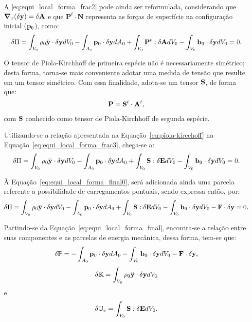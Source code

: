 A \autoref{eq:equi_local_forma_frac2} pode ainda ser reformulada, considerando que $\boldsymbol{\nabla}_x (\delta\mathbf{y}) = \delta \mathbf{A}$ e que $\mathbf{P}^t \cdot \mathbf{N}$ representa as forças de superfície na configuração inicial ($\mathbf{p}_{0}$), como:
\begin{align}
	\delta\Pi = \int_{V_{0}} \rho_{0} \ddot{\mathbf{y}} \cdot \delta\mathbf{y} dV_{0} - \int_{A_{0}} \mathbf{p}_{0} \cdot \delta\mathbf{y} dA_{0} + \int_{V_{0}} \mathbf{P}^{t} : \delta\mathbf{A} dV_{0} - \int_{V_{0}}  \mathbf{b}_0 \cdot \delta\mathbf{y} dV_{0} = 0. \label{eq:equi_local_forma_frac3}
\end{align}

O tensor de Piola-Kirchhoff de primeira espécie não é necessariamente simétrico; desta forma, torna-se mais conveniente adotar uma medida de tensão que resulte em um tensor simétrico. Com essa finalidade, adota-se um tensor $\mathbf{S}$, de forma que:
\begin{align}
	\mathbf{P} = \mathbf{S}^{t} \cdot \mathbf{A}^{t}, \label{eq:piola-kircchoff}
\end{align}
\noindent com $\mathbf{S}$ conhecido como tensor de Piola-Kirchhoff de segunda espécie. 

Utilizando-se a relação apresentada na Equação~\eqref{eq:piola-kircchoff} na Equação~\eqref{eq:equi_local_forma_frac3}, chega-se a:
\begin{align}
	\delta\Pi = \int_{V_{0}} \rho_{0} \ddot{\mathbf{y}} \cdot \delta\mathbf{y} dV_{0} - \int_{A_{0}} \mathbf{p}_{0} \cdot \delta\mathbf{y} dA_{0} +  \int_{V_{0}} \mathbf{S} : \delta\mathbf{E} dV_{0} - \int_{V_{0}}  \mathbf{b}_0 \cdot \delta\mathbf{y} dV_{0} = 0.
	\label{eq:equi_local_forma_final0}
\end{align}

À Equação~\eqref{eq:equi_local_forma_final0}, será adicionada ainda uma parcela referente a possibilidade de carregamentos pontuais, sendo expressa então, por:
\begin{align}
	\delta\Pi = \int_{V_{0}} \rho_{0} \ddot{\mathbf{y}} \cdot \delta\mathbf{y} dV_{0} - \int_{A_{0}} \mathbf{p}_{0} \cdot \delta\mathbf{y} dA_{0} +  \int_{V_{0}} \mathbf{S} : \delta\mathbf{E} dV_{0} - \int_{V_{0}}  \mathbf{b}_0 \cdot \delta\mathbf{y} dV_{0} - \mathbf{F} \cdot \delta\mathbf{y} = 0.
	\label{eq:equi_local_forma_final}
\end{align}

Partindo-se da Equação~\eqref{eq:equi_local_forma_final}, encontra-se a relação entre suas componentes e as parcelas de energia mecânica, dessa forma, tem-se que:
\begin{align}
	\delta\mathbb{P} = - \int_{A_{0}} \mathbf{p}_{0} \cdot \delta\mathbf{y} dA_{0} - \int_{V_{0}}  \mathbf{b}_0 \cdot \delta\mathbf{y} dV_{0} - \mathbf{F} \cdot \delta\mathbf{y},
\end{align}
\begin{align}
	\delta\mathbb{K} = \int_{V_{0}} \rho_{0} \ddot{\mathbf{y}} \cdot \delta\mathbf{y} dV_{0}
\end{align}
\noindent e
\begin{align}
	\delta\mathbb{U}_e = \int_{V_{0}} \mathbf{S} : \delta\mathbf{E} dV_{0}.
\end{align}

